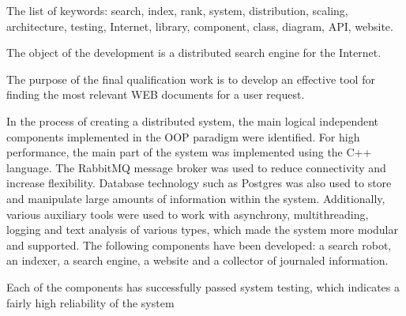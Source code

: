 The list of keywords: search, index, rank, system, distribution, scaling, architecture, testing, Internet, library, component, class, diagram, API, website.

The object of the development is a distributed search engine for the Internet.

The purpose of the final qualification work is to develop an effective tool for finding the most relevant WEB documents for a user request.

In the process of creating a distributed system, the main logical independent components implemented in the OOP paradigm were identified. For high performance, the main part of the system was implemented using the C++ language. The RabbitMQ message broker was used to reduce connectivity and increase flexibility. Database technology such as Postgres was also used to store and manipulate large amounts of information within the system. Additionally, various auxiliary tools were used to work with asynchrony, multithreading, logging and text analysis of various types, which made the system more modular and supported. The following components have been developed: a search robot, an indexer, a search engine, a website and a collector of journaled information.

Each of the components has successfully passed system testing, which indicates a fairly high reliability of the system
